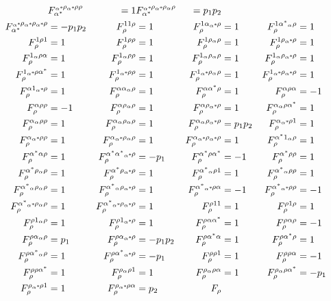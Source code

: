 {\begin{align}
&F_{\alpha^*}^{\alphastarrho\alphastarrho\rho}&=1&F_{\alpha^*}^{\alphastarrho\alphastarrho{}_\alpha\rho}&=p_1p_2\\F_{\alpha^*}^{\alphastarrho\alphastarrho\alphastarrho}&=-p_1p_2&F_{\rho}^{11\rho}&=1&F_{\rho}^{1\alpha\alphastarrho}&=1&F_{\rho}^{1\alpha^*{}_\alpha\rho}&=1\\F_{\rho}^{1\rho1}&=1&F_{\rho}^{1\rho\rho}&=1&F_{\rho}^{1\rho{}_\alpha\rho}&=1&F_{\rho}^{1\rho\alphastarrho}&=1\\F_{\rho}^{1{}_\alpha\rho\alpha}&=1&F_{\rho}^{1{}_\alpha\rho\rho}&=1&F_{\rho}^{1{}_\alpha\rho{}_\alpha\rho}&=1&F_{\rho}^{1{}_\alpha\rho\alphastarrho}&=1\\F_{\rho}^{1\alphastarrho\alpha^*}&=1&F_{\rho}^{1\alphastarrho\rho}&=1&F_{\rho}^{1\alphastarrho{}_\alpha\rho}&=1&F_{\rho}^{1\alphastarrho\alphastarrho}&=1\\F_{\rho}^{\alpha1\alphastarrho}&=1&F_{\rho}^{\alpha\alpha{}_\alpha\rho}&=1&F_{\rho}^{\alpha\alpha^*\rho}&=1&F_{\rho}^{\alpha\rho\alpha}&=-1\\F_{\rho}^{\alpha\rho\rho}&=-1&F_{\rho}^{\alpha\rho{}_\alpha\rho}&=1&F_{\rho}^{\alpha\rho\alphastarrho}&=1&F_{\rho}^{\alpha{}_\alpha\rho\alpha^*}&=1\\F_{\rho}^{\alpha{}_\alpha\rho\rho}&=1&F_{\rho}^{\alpha{}_\alpha\rho{}_\alpha\rho}&=1&F_{\rho}^{\alpha{}_\alpha\rho\alphastarrho}&=p_1p_2&F_{\rho}^{\alpha\alphastarrho1}&=1\\F_{\rho}^{\alpha\alphastarrho\rho}&=1&F_{\rho}^{\alpha\alphastarrho{}_\alpha\rho}&=1&F_{\rho}^{\alpha\alphastarrho\alphastarrho}&=1&F_{\rho}^{\alpha^*1{}_\alpha\rho}&=1\\F_{\rho}^{\alpha^*\alpha\rho}&=1&F_{\rho}^{\alpha^*\alpha^*\alphastarrho}&=-p_1&F_{\rho}^{\alpha^*\rho\alpha^*}&=-1&F_{\rho}^{\alpha^*\rho\rho}&=1\\F_{\rho}^{\alpha^*\rho{}_\alpha\rho}&=1&F_{\rho}^{\alpha^*\rho\alphastarrho}&=1&F_{\rho}^{\alpha^*{}_\alpha\rho1}&=1&F_{\rho}^{\alpha^*{}_\alpha\rho\rho}&=1\\F_{\rho}^{\alpha^*{}_\alpha\rho{}_\alpha\rho}&=1&F_{\rho}^{\alpha^*{}_\alpha\rho\alphastarrho}&=1&F_{\rho}^{\alpha^*\alphastarrho\alpha}&=-1&F_{\rho}^{\alpha^*\alphastarrho\rho}&=-1\\F_{\rho}^{\alpha^*\alphastarrho{}_\alpha\rho}&=1&F_{\rho}^{\alpha^*\alphastarrho\alphastarrho}&=1&F_{\rho}^{\rho11}&=1&F_{\rho}^{\rho1\rho}&=1\\F_{\rho}^{\rho1{}_\alpha\rho}&=1&F_{\rho}^{\rho1\alphastarrho}&=1&F_{\rho}^{\rho\alpha\alpha^*}&=1&F_{\rho}^{\rho\alpha\rho}&=-1\\F_{\rho}^{\rho\alpha{}_\alpha\rho}&=p_1&F_{\rho}^{\rho\alpha\alphastarrho}&=-p_1p_2&F_{\rho}^{\rho\alpha^*\alpha}&=1&F_{\rho}^{\rho\alpha^*\rho}&=1\\F_{\rho}^{\rho\alpha^*{}_\alpha\rho}&=1&F_{\rho}^{\rho\alpha^*\alphastarrho}&=-p_1&F_{\rho}^{\rho\rho1}&=1&F_{\rho}^{\rho\rho\alpha}&=-1\\F_{\rho}^{\rho\rho\alpha^*}&=1&F_{\rho}^{\rho{}_\alpha\rho1}&=1&F_{\rho}^{\rho{}_\alpha\rho\alpha}&=1&F_{\rho}^{\rho{}_\alpha\rho\alpha^*}&=-p_1\\F_{\rho}^{\rho\alphastarrho1}&=1&F_{\rho}^{\rho\alphastarrho\alpha}&=p_2&F_{\rho}
\end{align}}
